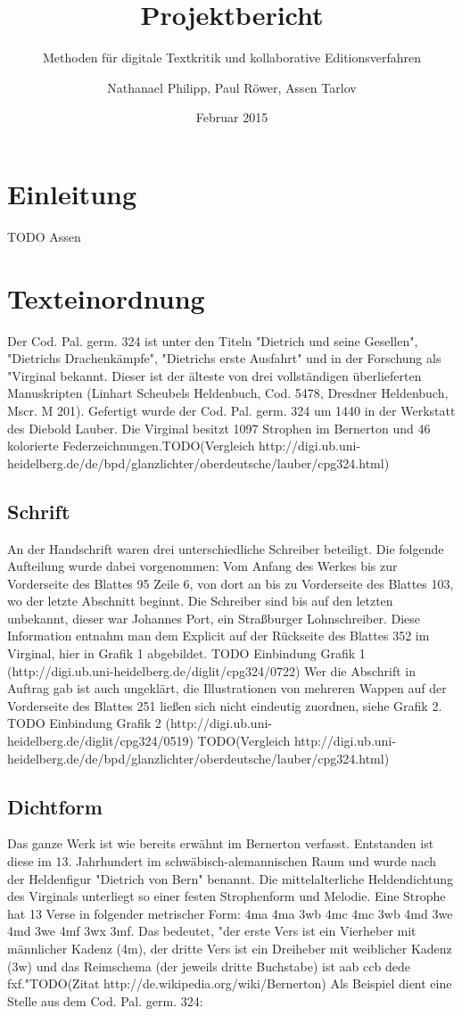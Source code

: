 \documentclass[a4paper, 12pt, oneside]{scrbook}
\author{Nathanael Philipp, Paul Röwer, Assen Tarlov}
\title{Projektbericht}
\subtitle{Methoden für digitale Textkritik und kollaborative Editionsverfahren}
\date{Februar 2015}
\begin{document}
\maketitle\newpage
\tableofcontents\newpage
\chapter{Einleitung}
TODO Assen

\chapter{Texteinordnung}
Der Cod. Pal. germ. 324 ist unter den Titeln "Dietrich und seine Gesellen", "Dietrichs Drachenkämpfe", "Dietrichs erste Ausfahrt" und in der Forschung als "Virginal bekannt. Dieser ist der älteste von drei vollständigen überlieferten Manuskripten (Linhart Scheubels Heldenbuch, Cod. 5478, Dresdner Heldenbuch, Mscr. M 201). Gefertigt wurde der Cod. Pal. germ. 324 um 1440 in der Werkstatt des Diebold Lauber. Die Virginal besitzt 1097 Strophen im Bernerton und 46 kolorierte Federzeichnungen.TODO(Vergleich http://digi.ub.uni-heidelberg.de/de/bpd/glanzlichter/oberdeutsche/lauber/cpg324.html)

\section{Schrift}
An der Handschrift waren drei unterschiedliche Schreiber beteiligt. Die folgende Aufteilung wurde dabei vorgenommen: Vom Anfang des Werkes bis zur Vorderseite des Blattes 95 Zeile 6, von dort an bis zu Vorderseite des Blattes 103, wo der letzte Abschnitt beginnt. Die Schreiber sind bis auf den letzten unbekannt, dieser war Johannes Port, ein Straßburger Lohnschreiber. Diese Information entnahm man dem Explicit auf der Rückseite des Blattes 352 im Virginal, hier in Grafik 1 abgebildet.
TODO Einbindung Grafik 1 (http://digi.ub.uni-heidelberg.de/diglit/cpg324/0722)
Wer die Abschrift in Auftrag gab ist auch ungeklärt, die Illustrationen von mehreren Wappen auf der Vorderseite des Blattes 251 ließen sich nicht eindeutig zuordnen, siehe Grafik 2.
TODO Einbindung Grafik 2 (http://digi.ub.uni-heidelberg.de/diglit/cpg324/0519)
TODO(Vergleich http://digi.ub.uni-heidelberg.de/de/bpd/glanzlichter/oberdeutsche/lauber/cpg324.html)

\section{Dichtform}
Das ganze Werk ist wie bereits erwähnt im Bernerton verfasst. Entstanden ist diese im 13. Jahrhundert im schwäbisch-alemannischen Raum und wurde nach der Heldenfigur "Dietrich von Bern" benannt. Die mittelalterliche Heldendichtung des Virginals unterliegt so einer festen Strophenform und Melodie. Eine Strophe hat 13 Verse in folgender metrischer Form: 4ma 4ma 3wb 4mc 4mc 3wb 4md 3we 4md 3we 4mf 3wx 3mf. Das bedeutet, "der erste Vers ist ein Vierheber mit männlicher Kadenz (4m), der dritte Vers ist ein Dreiheber mit weiblicher Kadenz (3w) und das Reimschema (der jeweils dritte Buchstabe) ist aab ccb dede fxf."TODO(Zitat http://de.wikipedia.org/wiki/Bernerton) Als Beispiel dient eine Stelle aus dem Cod. Pal. germ. 324:
\end{document}

